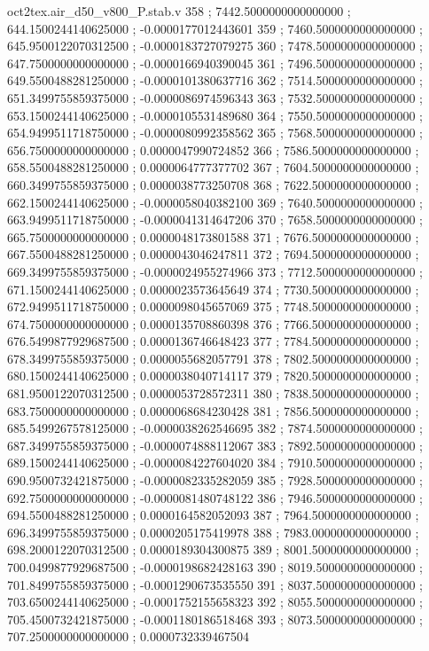 \begin{filecontents}[overwrite]{oct2tex.air_d50_v800_P.stab.v}
358 ; 7442.5000000000000000 ; 644.1500244140625000 ; -0.0000177012443601
359 ; 7460.5000000000000000 ; 645.9500122070312500 ; -0.0000183727079275
360 ; 7478.5000000000000000 ; 647.7500000000000000 ; -0.0000166940390045
361 ; 7496.5000000000000000 ; 649.5500488281250000 ; -0.0000101380637716
362 ; 7514.5000000000000000 ; 651.3499755859375000 ; -0.0000086974596343
363 ; 7532.5000000000000000 ; 653.1500244140625000 ; -0.0000105531489680
364 ; 7550.5000000000000000 ; 654.9499511718750000 ; -0.0000080992358562
365 ; 7568.5000000000000000 ; 656.7500000000000000 ; 0.0000047990724852
366 ; 7586.5000000000000000 ; 658.5500488281250000 ; 0.0000064777377702
367 ; 7604.5000000000000000 ; 660.3499755859375000 ; 0.0000038773250708
368 ; 7622.5000000000000000 ; 662.1500244140625000 ; -0.0000058040382100
369 ; 7640.5000000000000000 ; 663.9499511718750000 ; -0.0000041314647206
370 ; 7658.5000000000000000 ; 665.7500000000000000 ; 0.0000048173801588
371 ; 7676.5000000000000000 ; 667.5500488281250000 ; 0.0000043046247811
372 ; 7694.5000000000000000 ; 669.3499755859375000 ; -0.0000024955274966
373 ; 7712.5000000000000000 ; 671.1500244140625000 ; 0.0000023573645649
374 ; 7730.5000000000000000 ; 672.9499511718750000 ; 0.0000098045657069
375 ; 7748.5000000000000000 ; 674.7500000000000000 ; 0.0000135708860398
376 ; 7766.5000000000000000 ; 676.5499877929687500 ; 0.0000136746648423
377 ; 7784.5000000000000000 ; 678.3499755859375000 ; 0.0000055682057791
378 ; 7802.5000000000000000 ; 680.1500244140625000 ; 0.0000038040714117
379 ; 7820.5000000000000000 ; 681.9500122070312500 ; 0.0000053728572311
380 ; 7838.5000000000000000 ; 683.7500000000000000 ; 0.0000068684230428
381 ; 7856.5000000000000000 ; 685.5499267578125000 ; -0.0000038262546695
382 ; 7874.5000000000000000 ; 687.3499755859375000 ; -0.0000074888112067
383 ; 7892.5000000000000000 ; 689.1500244140625000 ; -0.0000084227604020
384 ; 7910.5000000000000000 ; 690.9500732421875000 ; -0.0000082335282059
385 ; 7928.5000000000000000 ; 692.7500000000000000 ; -0.0000081480748122
386 ; 7946.5000000000000000 ; 694.5500488281250000 ; 0.0000164582052093
387 ; 7964.5000000000000000 ; 696.3499755859375000 ; 0.0000205175419978
388 ; 7983.0000000000000000 ; 698.2000122070312500 ; 0.0000189304300875
389 ; 8001.5000000000000000 ; 700.0499877929687500 ; -0.0000198682428163
390 ; 8019.5000000000000000 ; 701.8499755859375000 ; -0.0001290673535550
391 ; 8037.5000000000000000 ; 703.6500244140625000 ; -0.0001752155658323
392 ; 8055.5000000000000000 ; 705.4500732421875000 ; -0.0001180186518468
393 ; 8073.5000000000000000 ; 707.2500000000000000 ; 0.0000732339467504

\end{filecontents}
